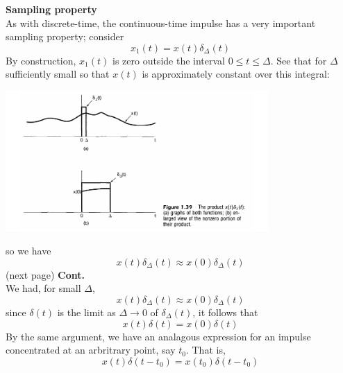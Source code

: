 \documentclass{report}
\begin{document}
\textbf{Sampling property}\\
As with discrete-time, the continuous-time impulse has a very important sampling property; consider 
\begin{equation*}
x_1(t)=x(t)\delta_\Delta(t)
\end{equation*}
By construction, $x_1(t)$ is zero outside the interval $0\leq t\leq\Delta$. See that for $\Delta$ sufficiently small so that
$x(t)$ is approximately constant over this integral:
\begin{center}
\includegraphics[width=10cm]{a12}
\end{center}
so we have
\begin{equation*}
x(t)\delta_\Delta(t)\approx x(0)\delta_\Delta(t)
\end{equation*}
(next page)\newpage
\noindent\textbf{Cont.}\\
We had, for small $\Delta$,
\begin{equation*}
x(t)\delta_\Delta(t)\approx x(0)\delta_\Delta(t)
\end{equation*}
since $\delta(t)$ is the limit as $\Delta\to0$ of $\delta_\Delta(t)$, it follows that
\begin{equation*}
x(t)\delta(t)=x(0)\delta(t)
\end{equation*}
By the same argument, we have an analagous expression for an impulse concentrated at an arbritrary point, say $t_0$. That is,
\begin{equation*}
x(t)\delta(t-t_0)=x(t_0)\delta(t-t_0)
\end{equation*}
\newpage
\end{document}
